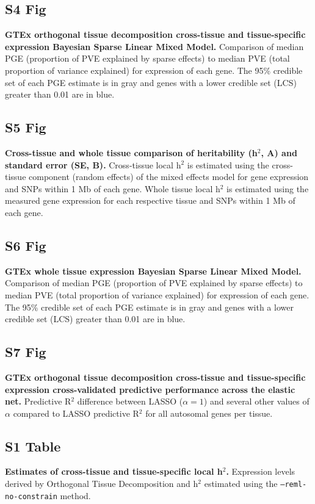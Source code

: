 \documentclass[10pt,letterpaper]{article}
\begin{document}
\subsection*{S4 Fig}
\label{S4_Fig}
{\bf GTEx orthogonal tissue decomposition cross-tissue and tissue-specific expression Bayesian Sparse Linear Mixed Model.} Comparison of median PGE (proportion of PVE explained by sparse effects) to median PVE (total proportion of variance explained) for expression of each gene. The 95\% credible set of each PGE estimate is in gray and genes with a lower credible set (LCS) greater than 0.01 are in blue.

\subsection*{S5 Fig}
\label{S5_Fig}
{\bf Cross-tissue and whole tissue comparison of heritability (h$^2$, A) and standard error (SE, B).} Cross-tissue local h$^2$ is estimated using the cross-tissue component (random effects) of the mixed effects model for gene expression and SNPs within 1 Mb of each gene. Whole tissue local h$^2$ is estimated using the measured gene expression for each respective tissue and SNPs within 1 Mb of each gene.

\subsection*{S6 Fig}
\label{S6_Fig}
{\bf GTEx whole tissue expression Bayesian Sparse Linear Mixed Model.} Comparison of median PGE (proportion of PVE explained by sparse effects) to median PVE (total proportion of variance explained) for expression of each gene. The 95\% credible set of each PGE estimate is in gray and genes with a lower credible set (LCS) greater than 0.01 are in blue.

\subsection*{S7 Fig}
\label{S7_Fig}
{\bf GTEx orthogonal tissue decomposition cross-tissue and tissue-specific expression cross-validated predictive performance across the elastic net.} Predictive R$^2$ difference between LASSO ($\alpha = 1$) and several other values of $\alpha$ compared to LASSO predictive R$^2$ for all autosomal genes per tissue.

\subsection*{S1 Table}
\label{S1_Table}
{\bf Estimates of cross-tissue and tissue-specific local h$^2$.} Expression levels derived by Orthogonal Tissue Decomposition and h$^2$ estimated using the \texttt{--reml-no-constrain} method.
\end{document}
